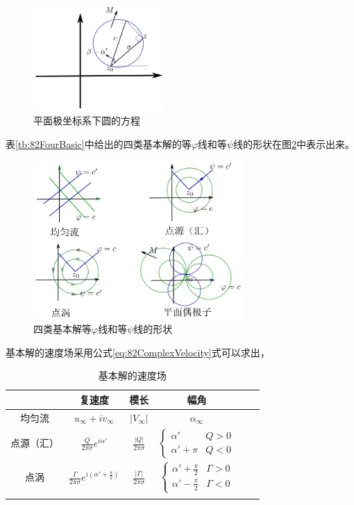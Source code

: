 \begin{figure}[!ht]
 \centering
 \includegraphics[width=5cm]{circleInPlanarCoordinate.eps}
 \caption{平面极坐标系下圆的方程}\label{fig:82circleInPlanarCoordinate}
\end{figure}

表\ref{tb:82FourBasic}中给出的四类基本解的等$\varphi$线和等$\psi$线的形状在图\ref{fig:82basicSolutionComplexPotential}中表示出来。

\begin{figure}[!ht]
 \centering
 \includegraphics[width=8cm]{basicSolutionComplexPotential.eps}
 \caption{四类基本解等$\varphi$线和等$\psi$线的形状}\label{fig:82basicSolutionComplexPotential}
\end{figure}

基本解的速度场采用公式\eqref{eq:82ComplexVelocity}式可以求出，
\begin{table}[!ht]
\centering
\begin{tabular}{cccccc}
\Xhline{1pt}
&复速度 & 模长 & 幅角\\
\hline\noalign{\smallskip}
均匀流 & $u_{\infty}+i v_{\infty}$ & $|V_{\infty}|$ & $\alpha_{\infty}$\\[0.1cm]
\hline\noalign{\smallskip}
点源（汇） & $\frac{Q}{2\pi \sigma} e^{i\alpha'}$ & $\frac{|Q|}{2\pi \sigma}$ & $\begin{cases}\alpha'&Q>0\\\alpha'+\pi&Q<0\end{cases}$ \\[0.1cm]
\hline\noalign{\smallskip}
点涡 & $\frac{\Gamma}{2\pi \sigma} e^{i(\alpha'+\frac{\pi}{2})}$ & $\frac{|\Gamma|}{2\pi \sigma}$ & $\begin{cases}\alpha'+\frac{\pi}{2}&\Gamma>0\\ \alpha'-\frac{\pi}{2}&\Gamma<0\end{cases}$ \\[0.1cm]
\Xhline{1pt}
\end{tabular}
\caption{基本解的速度场}
\end{table}

